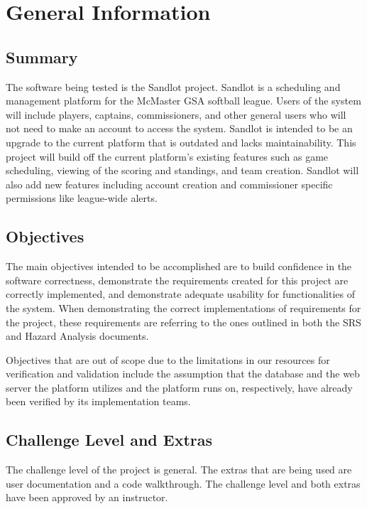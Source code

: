 \documentclass[12pt, titlepage]{article}
\begin{document}
\section{General Information}

\subsection{Summary}

The software being tested is the Sandlot project. Sandlot is a scheduling and
management platform for the McMaster GSA softball league. Users of the system
will include players, captains, commissioners, and other general users who will
not need to make an account to access the system. Sandlot is intended to be an
upgrade to the current platform that is outdated and lacks maintainability. This
project will build off the current platform's existing features such as game
scheduling, viewing of the scoring and standings, and team creation. Sandlot will
also add new features including account creation and commissioner specific
permissions like league-wide alerts.

\subsection{Objectives}

The main objectives intended to be accomplished are to build confidence in the software
correctness, demonstrate the requirements created for this project are correctly
implemented, and demonstrate adequate usability for functionalities of the
system. When demonstrating the correct implementations of requirements for the
project, these requirements are referring to the ones outlined in both the
SRS and Hazard Analysis documents.

Objectives that are out of scope due to the limitations in our resources for
verification and validation include the assumption that the database and the web
server the platform utilizes and the platform runs on, respectively, have already
been verified by its implementation teams.

\subsection{Challenge Level and Extras}

The challenge level of the project is general. The extras that are being used
are user documentation and a code walkthrough. The challenge level and both extras
have been approved by an instructor.
\end{document}
